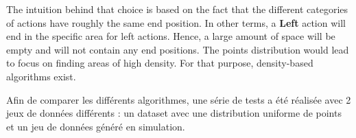 \documentclass{llncs}
\begin{document}

The intuition behind that choice is based on the fact that the different categories of actions have roughly the same end position. In other terms, a \textbf{Left} action will end in the specific area for left actions. Hence, a large amount of space will be empty and will not contain any end positions. The points distribution would lead to focus on finding areas of high density. For that purpose, density-based algorithms exist.

Afin de comparer les différents algorithmes, une série de tests a été réalisée avec 2 jeux de données différents : un dataset avec une distribution uniforme de points et un jeu de données généré en simulation.




%

\end{document}
